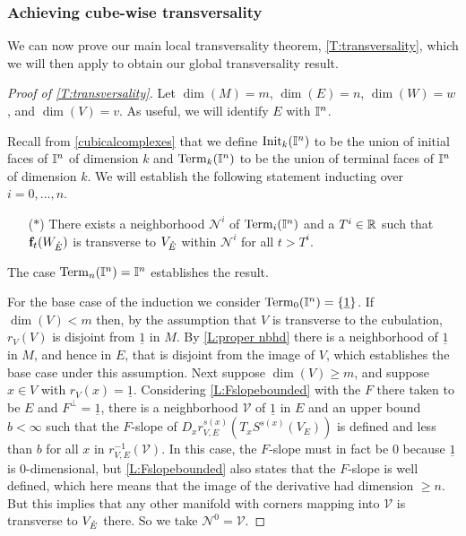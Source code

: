

\subsubsection{Achieving cube-wise transversality}

We can now prove our main local transversality theorem, \cref{T:transversality}, which we will then apply to obtain our global transversality result.

\begin{proof}[Proof of \cref{T:transversality}]
	Let $\dim(M) = m$, $\dim(E) = n$, $\dim(W) = w$, and $\dim(V) = v$.
	As useful, we will identify $E$ with $\mathbb{I}^n$.

	Recall from \cref{cubicalcomplexes} that we define ${\rm Init}_k(\mathbb{I}^n)$ to be the union of initial faces of $\mathbb{I}^n$ of dimension $k$ and ${\rm Term}_k(\mathbb{I}^n)$ to be the union of terminal faces of $\mathbb{I}^n$ of dimension $k$.
	We will establish the following statement inducting over $i = 0, \dots, n$.
	\begin{itemize}
		\item[($\ast$)] There exists a neighborhood $\mathcal N^i$ of ${\rm Term}_{i}(\mathbb{I}^n)$ and a $T^i \in \mathbb{R}$ such that $\mathbf{f}_t(W_{\mathring{E}})$ is transverse to $V_{\mathring{E}}$ within $\mathcal N^i$ for all $t > T^i$.
	\end{itemize}
	The case $ {\rm Term}_{n}(\mathbb{I}^n) = \mathbb{I}^n$ establishes the result.

	For the base case of the induction we consider ${\rm Term}_0(\mathbb{I}^n) = \{\underline{1}\}$.
	If $\dim(V) < m$ then, by the assumption that $V$ is transverse to the cubulation, $r_V(V)$ is disjoint from $\underline{1}$ in $M$.
	By \cref{L:proper nbhd} there is a neighborhood of $\underline{1}$ in $M$, and hence in $E$, that is disjoint from the image of $V$, which establishes the base case under this assumption.
	Next suppose $\dim(V) \geq m$, and suppose $x \in V$ with $r_V(x) = \underline{1}$.
	Considering \cref{L:Fslopebounded} with the $F$ there taken to be $E$ and $F^\perp = \underline{1}$, there is a neighborhood $\mathcal{V}$ of $\underline{1}$ in $E$ and an upper bound $b < \infty$ such that the $F$-slope of $D_xr^{s(x)}_{V,E}(T_xS^{s(x)}(V_E))$ is defined and less than $b$ for all $x$ in $r_{V,E}^{-1}(\mathcal{V})$.
	In this case, the $F$-slope must in fact be $0$ because $\underline{1}$ is $0$-dimensional, but \cref{L:Fslopebounded} also states that the $F$-slope is well defined, which here means that the image of the derivative had dimension $\geq n$.
	But this implies that any other manifold with corners mapping into $\mathcal V$ is transverse to $V_{\mathring{E}}$ there.
	So we take $\mathcal N^0 = \mathcal V$.


\end{proof}
